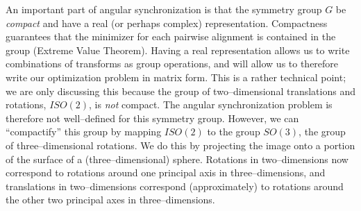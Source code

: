 \documentclass[12pt]{article}
\begin{document}
An important part of angular synchronization is that the symmetry group $G$ be {\em compact} and have a real (or perhaps complex) representation.
%
Compactness guarantees that the minimizer for each pairwise alignment is contained in the group (Extreme Value Theorem). 
%
Having a real representation allows us to write combinations of transforms as group operations, and will allow us to therefore write our optimization problem in matrix form. 
%
This is a rather technical point;
we are only discussing this because the group of two--dimensional translations and rotations, $ISO(2)$, is {\em not} compact.
%
The angular synchronization problem is therefore not well--defined for this symmetry group.
%
However, we can ``compactify'' this group by mapping $ISO(2)$ to the group $SO(3)$, the group of three--dimensional rotations.
%
We do this by projecting the image onto a portion of the surface of a (three--dimensional) sphere.
%
Rotations in two--dimensions now correspond to rotations around one principal axis in three--dimensions, and translations in two--dimensions correspond (approximately) to rotations around the other two principal axes in three--dimensions.
\end{document}
